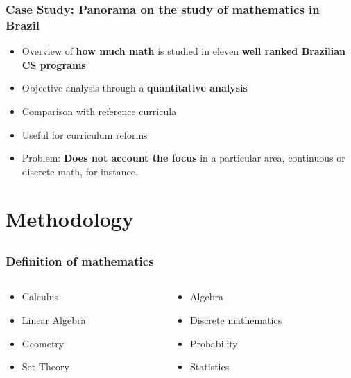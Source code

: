 \documentclass{beamer}
\begin{document}
\begin{frame}
\frametitle{Case Study: Panorama on the study of mathematics in Brazil}
\begin{itemize}
	\item Overview of \textbf{\textcolor{n_red}{how much math}} is studied in
	eleven \textbf{\textcolor{n_blue}{well ranked Brazilian CS programs}}
	\item Objective analysis through a \textbf{\textcolor{n_violet}{quantitative analysis}}
	\item Comparison with reference curricula
	\item Useful for curriculum reforms
	\item Problem: \textbf{\textcolor{RawSienna}{Does not account the focus}}
	in a particular area, continuous or discrete math, for instance.
\end{itemize}
\end{frame}


\section{Methodology}
\subsection{}

\begin{frame}
\frametitle{Definition of mathematics}
\begin{columns}
\begin{column}{0.5\textwidth}
	\begin{itemize}
		\item Calculus
		\item Linear Algebra
		\item Geometry
		\item Set Theory
	\end{itemize}
\end{column}
\begin{column}{0.5\textwidth}
	\begin{itemize}
		\item Algebra
		\item Discrete mathematics
		\item Probability
		\item Statistics
	\end{itemize}
\end{column}
\end{columns}

\end{frame}
\end{document}
